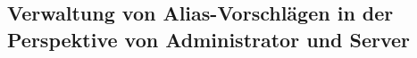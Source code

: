 \subsection{Verwaltung von Alias-Vorschlägen in der Perspektive von Administrator und Server}

\begin{figure}[H]
	\begin{center}
	\end{center}
\end{figure}
